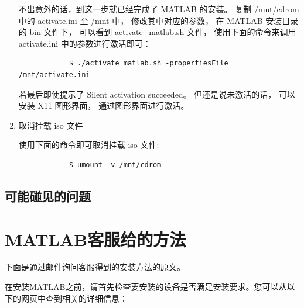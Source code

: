 \documentclass[UTF8]{article}   %
\numberwithin{equation}{section} %
\begin{document}
\begin{enumerate}
		不出意外的话，到这一步就已经完成了 MATLAB 的安装。
		复制 /mnt/cdrom 中的 activate.ini 至 /mnt 中，
		修改其中对应的参数，
		在 MATLAB 安装目录的 bin 文件下，
		可以看到 activate_matlab.sh 文件，
		使用下面的命令来调用 activate.ini 中的参数进行激活即可：
		\begin{verbatim}
			$ ./activate_matlab.sh -propertiesFile /mnt/activate.ini
		\end{verbatim}
		
		若最后即使提示了 Silent activation succeeded。
		但还是说未激活的话，
		可以安装 X11 图形界面，
		通过图形界面进行激活。
	\item 取消挂载 iso 文件

		使用下面的命令即可取消挂载 iso 文件:
		\begin{verbatim}
			$ umount -v /mnt/cdrom
		\end{verbatim}
\end{enumerate}

\subsection{可能碰见的问题}
\label{SubSec 可能碰见的问题}

\section{MATLAB客服给的方法}
\label{Sec MATLAB客服给的方法}
下面是通过邮件询问客服得到的安装方法的原文。

在安装MATLAB之前，请首先检查要安装的设备是否满足安装要求。您可以从以下的网页中查到相关的详细信息：
\end{document}
